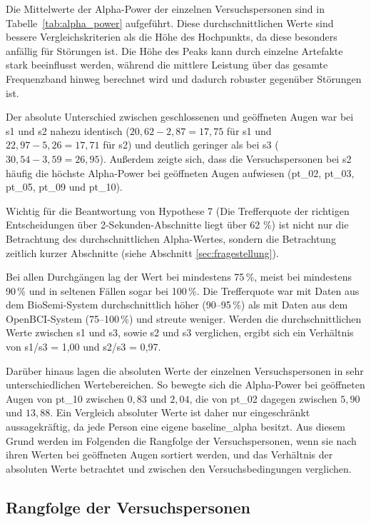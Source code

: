 Die Mittelwerte der Alpha-Power der einzelnen Versuchspersonen sind in Tabelle~\ref{tab:alpha_power} aufgeführt. Diese durchschnittlichen Werte sind bessere Vergleichskriterien als die Höhe des Hochpunkts, da diese besonders anfällig für Störungen ist. Die Höhe des Peaks kann durch einzelne Artefakte stark beeinflusst werden, während die mittlere Leistung über das gesamte Frequenzband hinweg berechnet wird und dadurch robuster gegenüber Störungen ist.

Der absolute Unterschied zwischen geschlossenen und geöffneten Augen war bei s1 und s2 nahezu identisch ($20{,}62 - 2{,}87 = 17{,}75$ für s1 und $22{,}97 - 5{,}26 = 17{,}71$ für s2) und deutlich geringer als bei s3 ($30{,}54 - 3{,}59 = 26{,}95$). Außerdem zeigte sich, dass die Versuchspersonen bei s2 häufig die höchste Alpha-Power bei geöffneten Augen aufwiesen (pt\_02, pt\_03, pt\_05, pt\_09 und pt\_10).

Wichtig für die Beantwortung von Hypothese 7 (Die Trefferquote der richtigen Entscheidungen über 2-Sekunden-Abschnitte liegt über 62 \%) ist nicht nur die Betrachtung des durchschnittlichen Alpha-Wertes, sondern die Betrachtung zeitlich kurzer Abschnitte (siehe Abschnitt \ref{sec:fragestellung}).

Bei allen Durchgängen lag der Wert bei mindestens 75\,\%, meist bei mindestens 90\,\% und in seltenen Fällen sogar bei 100\,\%. Die Trefferquote war mit Daten aus dem BioSemi-System durchschnittlich höher (90--95\,\%) als mit Daten aus dem OpenBCI-System (75--100\,\%) und streute weniger. Werden die durchschnittlichen Werte zwischen s1 und s3, sowie s2 und s3 verglichen, ergibt sich ein Verhältnis von s1/s3 = 1,00 und s2/s3 = 0,97.

Darüber hinaus lagen die absoluten Werte der einzelnen Versuchspersonen in sehr unterschiedlichen Wertebereichen. So bewegte sich die Alpha-Power bei geöffneten Augen von pt\_10 zwischen $0{,}83$ und $2{,}04$, die von pt\_02 dagegen zwischen $5{,}90$ und $13{,}88$. Ein Vergleich absoluter Werte ist daher nur eingeschränkt aussagekräftig, da jede Person eine eigene \gls{baseline_alpha} besitzt. Aus diesem Grund werden im Folgenden die Rangfolge der Versuchspersonen, wenn sie nach ihren Werten bei geöffneten Augen sortiert werden, und das Verhältnis der absoluten Werte betrachtet und zwischen den Versuchsbedingungen verglichen.

\subsection{Rangfolge der Versuchspersonen}

